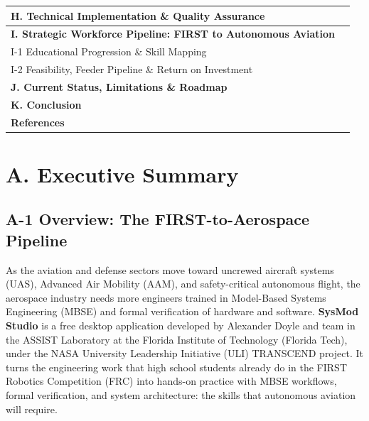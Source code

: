 \documentclass[11pt,letterpaper]{article}
\begin{document}
\begin{tabularx}{\linewidth}{X r}
\midrule
\textbf{H. Technical Implementation \& Quality Assurance} & \textbf{\pageref{sec:H}} \\
\midrule
\textbf{I. Strategic Workforce Pipeline: FIRST to Autonomous Aviation} & \textbf{\pageref{sec:I}} \\
\hspace{1.5em} I-1 Educational Progression \& Skill Mapping & \pageref{sec:I1} \\
\hspace{1.5em} I-2 Feasibility, Feeder Pipeline \& Return on Investment & \pageref{sec:I2} \\
\midrule
\textbf{J. Current Status, Limitations \& Roadmap} & \textbf{\pageref{sec:J}} \\
\midrule
\textbf{K. Conclusion} & \textbf{\pageref{sec:K}} \\
\midrule
\textbf{References} & \textbf{\pageref{sec:refs}} \\
\bottomrule
\end{tabularx}

\newpage

\section*{\Large {A. Executive Summary}}\label{sec:A}

\subsection*{\normalsize {A-1 Overview: The FIRST-to-Aerospace Pipeline}}\label{sec:A1}
As the aviation and defense sectors move toward uncrewed aircraft systems (UAS), Advanced Air Mobility (AAM), and safety-critical autonomous flight, the aerospace industry needs more engineers trained in Model-Based Systems Engineering (MBSE) and formal verification of hardware and software. \textbf{SysMod Studio} is a free desktop application developed by Alexander Doyle and team in the ASSIST Laboratory at the Florida Institute of Technology (Florida Tech), under the NASA University Leadership Initiative (ULI) TRANSCEND project. It turns the engineering work that high school students already do in the FIRST Robotics Competition (FRC) into hands-on practice with MBSE workflows, formal verification, and system architecture: the skills that autonomous aviation will require.
\end{document}
